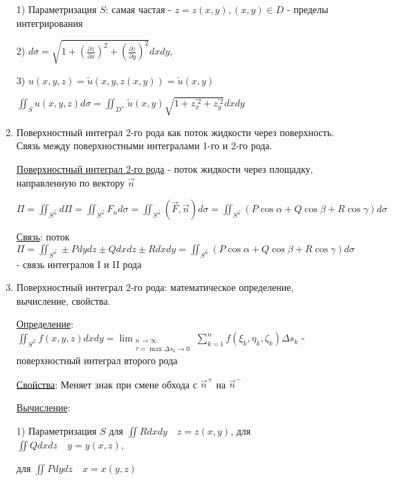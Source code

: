 \documentclass[12pt]{article}
\begin{document}
\begin{enumerate}
        1) Параметризация $S$: самая частая - $z = z(x, y), (x, y) \in D$ - пределы интегрирования

        2) $d\sigma = \sqrt{1 + \left(\frac{\partial z}{\partial x}\right)^2 + \left(\frac{\partial z}{\partial y}\right)^2} dxdy$,

        3) $u(x, y, z) = \tilde{u}(x, y, z(x, y)) = \tilde{u}(x, y)$

        $\iint_S u(x, y, z) d\sigma = \iint_{D^+} \tilde{u}(x, y) \sqrt{1 + z_x^{\prime 2} + z_y^{\prime 2}} dxdy$


        \item Поверхностный интеграл 2-го рода как поток жидкости через поверхность. Связь между поверхностными интегралами 1-го и 2-го рода.

        \hyperlink{surfaceintegralofsecondkind}{Поверхностный интеграл 2-го рода} - поток жидкости через площадку, направленную по вектору $\overrightarrow{n}$

        $\Pi = \iint_{S^{\overrightarrow{n}}} d\Pi = \iint_{S^{\overrightarrow{n}}} F_n d\sigma = \iint_{S^{\overrightarrow{n}}} (\overrightarrow{F}, \overrightarrow{n})d\sigma = \iint_{S^{\overrightarrow{n}}} (P\cos\alpha + Q\cos\beta + R\cos\gamma)d\sigma$

        \hyperlink{connectionbetweensurfaceintegral}{Связь}: поток $\Pi = \iint_{S^{\overrightarrow{n}}} \pm Pdydz \pm Qdxdz \pm Rdxdy = \iint_{S^{\overrightarrow{n}}} (P\cos\alpha + Q\cos\beta + R\cos\gamma) d\sigma$ - связь интегралов I и II рода

        \item Поверхностный интеграл 2-го рода: математическое определение, вычисление, свойства.

        \hyperlink{surfaceintegralofsecondkindmath}{Определение}: $\iint_{S^{\overrightarrow{n}}} f(x, y, z) dxdy = \lim_{\substack{n \to \infty \\ \tau = \max \Delta s_k \to 0}} \sum_{k=1}^n f(\xi_k, \eta_k, \zeta_k) \Delta s_k$ - поверхностный интеграл второго рода

        \hyperlink{surfaceintegralofsecondkindproperties}{Свойства}: Меняет знак при смене обхода с $\overrightarrow{n}^+$ на $\overrightarrow{n}^-$

        \hyperlink{surfaceintegralofsecondkindcalculation}{Вычисление}:

        1) Параметризация $S$ \quad для $\iint Rdxdy \quad z = z(x, y)$, для $\iint Qdxdz \quad y = y(x, z)$,

        для $\iint Pdydz \quad x = x(y, z)$


\end{enumerate}
\end{document}
